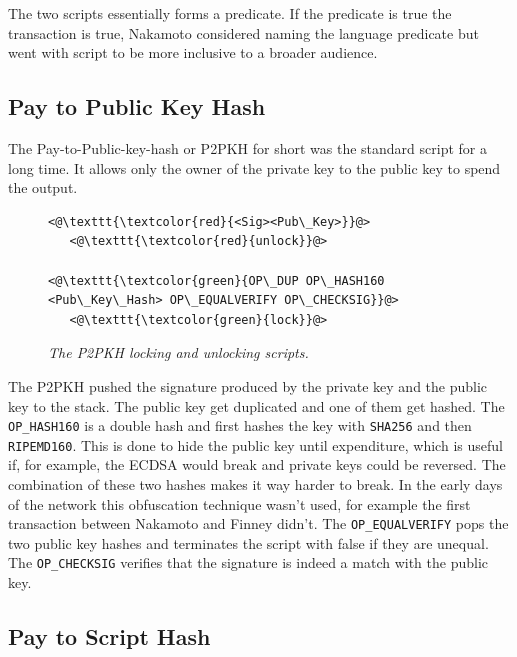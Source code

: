 The two scripts essentially forms a predicate. If the predicate is true the transaction is true, Nakamoto considered naming the language predicate but went with script to be more inclusive to a broader audience\cite{nakamoto:predicate}.

\subsection{Pay to Public Key Hash}

The Pay-to-Public-key-hash or P2PKH for short was the standard script for a long time. It allows only the owner of 
the private key to the public key to spend the output.


\begin{figure}[!hbt]
	
	\begin{lstlisting}
<@\texttt{\textcolor{red}{<Sig><Pub\_Key>}}@>   
   <@\texttt{\textcolor{red}{unlock}}@>
   
<@\texttt{\textcolor{green}{OP\_DUP OP\_HASH160 <Pub\_Key\_Hash> OP\_EQUALVERIFY OP\_CHECKSIG}}@>
   <@\texttt{\textcolor{green}{lock}}@>
	\end{lstlisting}
	
	\caption{\textit{ The P2PKH locking and unlocking scripts.
	}}
	\label{fig:P2PKH}
\end{figure}

The P2PKH pushed the signature produced by the private key and the public key to the stack. The public key get duplicated and one of them get hashed. The \texttt{OP\_HASH160} is a double hash and first hashes the key with \texttt{SHA256} and then \texttt{RIPEMD160}. This is done to hide the public key until expenditure, which is useful if, for example, the ECDSA would break and private keys could be reversed. The combination of these two hashes makes it way harder to break. In the early days of the network this obfuscation technique wasn't used, for example the first transaction between Nakamoto and Finney didn't\cite{nakamoto:finney:tx}.
The \texttt{OP\_EQUALVERIFY} pops the two public key hashes and terminates the script with false if they are unequal.
The \texttt{OP\_CHECKSIG} verifies that the signature is indeed a match with the public key. 

\subsection{Pay to Script Hash}

